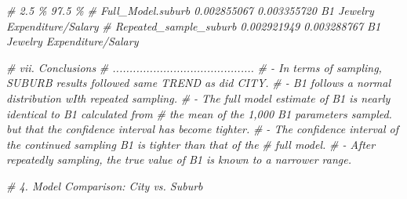 \documentclass[
]{article}
\newenvironment{Shaded}{\begin{snugshade}}{\end{snugshade}}
\newcommand{\CommentTok}[1]{\textcolor[rgb]{0.56,0.35,0.01}{\textit{#1}}}
\begin{document}
\begin{Shaded}
\begin{Highlighting}[]
    \CommentTok{\#                               2.5 \%       97.5 \%}
    \CommentTok{\# Full\_Model.suburb       0.002855067     0.003355720   B1 Jewelry Expenditure/Salary}
    \CommentTok{\# Repeated\_sample\_suburb  0.002921949     0.003288767   B1 Jewelry Expenditure/Salary}



\CommentTok{\# vii. Conclusions}
\CommentTok{\# ..........................................}
    \CommentTok{\# {-} In terms of sampling, SUBURB results followed same TREND as did CITY.  }
    \CommentTok{\# {-} B1 follows a normal distribution wIth repeated sampling. }
    \CommentTok{\# {-} The full model  estimate of B1 is nearly identical to B1 calculated from}
    \CommentTok{\#   the mean of the 1,000 B1 parameters sampled. but that the confidence interval has become tighter. }
    \CommentTok{\# {-} The confidence interval of the continued sampling B1 is tighter than that of the}
    \CommentTok{\#   full model. }
    \CommentTok{\# {-} After repeatedly sampling, the true value of B1 is known to a narrower range.}
\end{Highlighting}
\end{Shaded}

\begin{Shaded}
\begin{Highlighting}[]
\CommentTok{\# 4. Model Comparison: City vs. Suburb}
\end{Highlighting}
\end{Shaded}
\end{document}
